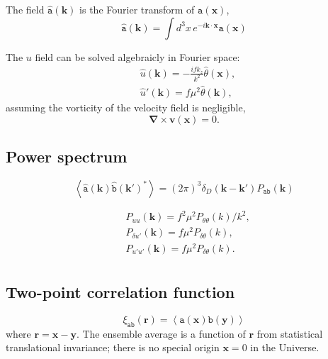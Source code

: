 \documentclass[a4paper,11pt, fleqn]{article}
\begin{document}
\vspace{5mm}
The field $\hat{\texttt{a}}(\bm{k})$ is
the Fourier transform of $\texttt{a}(\bm{x})$, 
\begin{equation}
  \hat{\texttt{a}}(\bm{k}) =
  \int\! d^3 x \, e^{-i\bm{k}\cdot\bm{x}} \texttt{a}(\bm{x})
\end{equation}

The $u$ field can be solved algebraicly in Fourier space:
%
\begin{align}
  &\hat{u}(\bm{k}) = -\frac{ifk_z}{k^2} \hat{\theta}(\bm{x}),\\
  &\hat{u}'(\bm{k}) = f\mu^2 \hat{\theta}(\bm{k}),
\end{align}
%
assuming the vorticity of the velocity field is negligible,
%
\begin{equation}
  \bm{\nabla} \times \bm{v}(\bm{x}) = 0.
\end{equation}

\clearpage
\subsection{Power spectrum}
\begin{equation}
  \left\langle \hat{\mathtt{a}}(\bm{k}) \hat{\mathtt{b}}(\bm{k}')^* \right\rangle
  = (2\pi)^3 \delta_D(\bm{k}-\bm{k}') P_{\mathtt{ab}}(\bm{k})
\end{equation}

\begin{align}
  &P_{uu}(\bm{k}) = f^2\mu^2 P_{\theta\theta}(k)/k^2,\\
  &P_{\delta u'}(\bm{k}) = f \mu^2 P_{\delta \theta}(k),\\
  &P_{u' u'}(\bm{k}) = f \mu^2 P_{\delta \theta}(k).\\
\end{align}


\clearpage
\subsection{Two-point correlation function}

\begin{equation}
  \xi_{\mathtt{ab}}(\bm{r}) = \left\langle \mathtt{a}(\bm{x}) \mathtt{b}(\bm{y})
                             \right\rangle
\end{equation}
%
where $\bm{r} = \bm{x} - \bm{y}$. The ensemble average is a function
of $\bm{r}$ from statistical translational invariance; there is no
special origin $\bm{x} = 0$ in the Universe.\\
\end{document}
